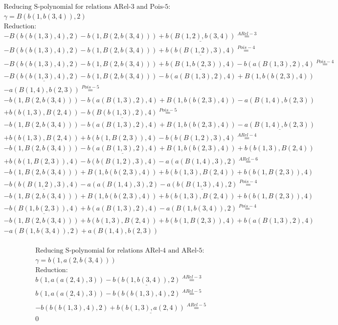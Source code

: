 \documentclass[11pt]{amsart}
\begin{document}
\begin{align*} 
& \text{Reducing S-polynomial for relations ARel-3 and Pois-5:} \\ 
& \gamma = B(b(1,b(3,4)),2) \\ 
& \text{Reduction}: \\& - B(b(b(1,3),4),2) - b(1,B(2,b(3,4))) + \underline{b(B(1,2),b(3,4))} \stackrel{ ARel-3 }{=}  \\ 
& - B(b(b(1,3),4),2) - b(1,B(2,b(3,4))) + \underline{b(b(B(1,2),3),4)} \stackrel{ Pois-4 }{=}  \\ 
& - B(b(b(1,3),4),2) - b(1,B(2,b(3,4))) + \underline{b(B(1,b(2,3)),4)} - b(a(B(1,3),2),4) \stackrel{ Pois-4 }{=}  \\ 
& - \underline{B(b(b(1,3),4),2)} - b(1,B(2,b(3,4))) - b(a(B(1,3),2),4) + B(1,b(b(2,3),4))\\ 
 &  - a(B(1,4),b(2,3)) \stackrel{ Pois-5 }{=}  \\ 
& - b(1,B(2,b(3,4))) - b(a(B(1,3),2),4) + B(1,b(b(2,3),4)) - a(B(1,4),b(2,3))\\ 
 &  + b(b(1,3),B(2,4)) - \underline{b(B(b(1,3),2),4)} \stackrel{ Pois-5 }{=}  \\ 
& - b(1,B(2,b(3,4))) - b(a(B(1,3),2),4) + B(1,b(b(2,3),4)) - \underline{a(B(1,4),b(2,3))}\\ 
 &  + b(b(1,3),B(2,4)) + b(b(1,B(2,3)),4) - b(b(B(1,2),3),4) \stackrel{ ARel-4 }{=}  \\ 
& - b(1,B(2,b(3,4))) - \underline{b(a(B(1,3),2),4)} + B(1,b(b(2,3),4)) + b(b(1,3),B(2,4))\\ 
 &  + b(b(1,B(2,3)),4) - b(b(B(1,2),3),4) - a(a(B(1,4),3),2) \stackrel{ ARel-6 }{=}  \\ 
& - b(1,B(2,b(3,4))) + B(1,b(b(2,3),4)) + b(b(1,3),B(2,4)) + b(b(1,B(2,3)),4)\\ 
 &  - \underline{b(b(B(1,2),3),4)} - a(a(B(1,4),3),2) - \underline{a(b(B(1,3),4),2)} \stackrel{ Pois-4 }{=}  \\ 
& - b(1,B(2,b(3,4))) + B(1,b(b(2,3),4)) + b(b(1,3),B(2,4)) + b(b(1,B(2,3)),4)\\ 
 &  - \underline{b(B(1,b(2,3)),4)} + b(a(B(1,3),2),4) - a(B(1,b(3,4)),2) \stackrel{ Pois-4 }{=}  \\ 
& - b(1,B(2,b(3,4))) + b(b(1,3),B(2,4)) + b(b(1,B(2,3)),4) + b(a(B(1,3),2),4)\\ 
 &  - a(B(1,b(3,4)),2) + a(B(1,4),b(2,3))\\ 
\end{align*} 
 
\begin{align*} 
& \text{Reducing S-polynomial for relations ARel-4 and ARel-5:} \\ 
& \gamma = b(1,a(2,b(3,4))) \\ 
& \text{Reduction}: \\&b(1,a(a(2,4),3)) - \underline{b(b(1,b(3,4)),2)} \stackrel{ ARel-3 }{=}  \\ 
&\underline{b(1,a(a(2,4),3))} - b(b(b(1,3),4),2) \stackrel{ ARel-5 }{=}  \\ 
& - b(b(b(1,3),4),2) + \underline{b(b(1,3),a(2,4))} \stackrel{ ARel-5 }{=}  \\ 
&0\\ 
\end{align*} 
 
\end{document}
